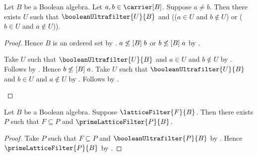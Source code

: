 \begin{theorem}\label{boolean_ultrafilter_separates_unequal}
    Let $B$ be a Boolean algebra.
    Let $a,b\in\carrier[B]$.
    Suppose $a\neq b$.
    Then there exists $U$ such that $\booleanUltrafilter{U}{B}$ and
        (($a\in U$ and $b\notin U$) or
         ($b\in U$ and $a\notin U$)).
\end{theorem}
\begin{proof}
    Hence $B$ is an ordered set by .
    $a\not\mathrel{\leq[B]}b$ or
        $b\not\mathrel{\leq[B]}a$ by
        .
    \begin{byCase}
        Take $U$ such that $\booleanUltrafilter{U}{B}$ and
            $a\in U$ and $b\notin U$ by
            .
        Follows by \auto.
        Hence $b\not\mathrel{\leq[B]}a$.
        Take $U$ such that $\booleanUltrafilter{U}{B}$ and
            $b\in U$ and $a\notin U$ by
            .
        Follows by \auto.
    \end{byCase}
\end{proof}

\begin{theorem}\label{boolean_prime_filter_theorem}
    Let $B$ be a Boolean algebra.
    Suppose $\latticeFilter{F}{B}$.
    Then there exists $P$ such that $F\subseteq P$ and
        $\primeLatticeFilter{P}{B}$.
\end{theorem}
\begin{proof}
    Take $P$ such that $F\subseteq P$ and
        $\booleanUltrafilter{P}{B}$ by
        .
    Hence $\primeLatticeFilter{P}{B}$ by
        .
\end{proof}
